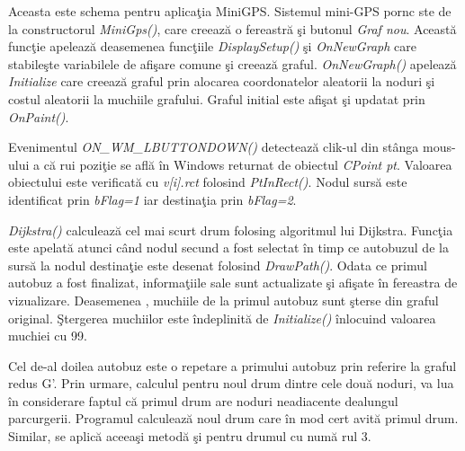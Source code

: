 \documentclass[11pt,a4paper]{report}
\begin{document}
\newline

     Aceasta este schema pentru aplica\c tia MiniGPS. Sistemul mini-GPS pornc ste de la constructorul \textit{MiniGps()}, care creeaz\u a o fereastr\u a \c si butonul \textit{Graf nou}. Aceast\u a func\c tie apeleaz\u a deasemenea func\c tiile \textit{DisplaySetup()} \c si \textit{OnNewGraph} care stabile\c ste variabilele de afi\c sare comune \c si creeaz\u a graful. \textit{OnNewGraph()} apeleaz\u a \textit{Initialize} care creeaz\u a graful prin alocarea coordonatelor aleatorii la noduri \c si costul aleatorii la muchiile grafului. Graful initial este afi\c sat \c si updatat prin \textit{OnPaint()}.
     
     Evenimentul \textit{ON\_WM\_LBUTTONDOWN()} detecteaz\u a clik-ul din st\^ anga mous-ului a c\u a rui pozi\c tie se afl\u a \^ in Windows returnat de obiectul \textit{CPoint pt}. Valoarea obiectului este verificat\u a cu \textit{v[i].rct} folosind \textit{PtInRect()}. Nodul surs\u a este identificat prin \textit{bFlag=1} iar destina\c tia prin \textit{bFlag=2}.
     
     \textit{Dijkstra()} calculeaz\u a cel mai scurt drum folosing algoritmul lui Dijkstra. Func\c tia este apelat\u a atunci c\^ and nodul secund a fost selectat \^ in timp ce autobuzul de la surs\u a la nodul destina\c tie este desenat folosind \textit{DrawPath()}. Odata ce primul autobuz a fost finalizat, informa\c tiile sale sunt actualizate \c si afi\c sate \^ in fereastra de vizualizare. Deasemenea , muchiile de la primul autobuz sunt \c sterse din graful original. \c Stergerea muchiilor este \^ indeplinit\u a de \textit{Initialize()} \^ inlocuind valoarea muchiei cu 99.
     
     Cel de-al doilea autobuz este o repetare a primului autobuz prin referire la graful redus G'. Prin urmare, calculul pentru noul drum dintre cele dou\u a noduri, va lua \^ in considerare faptul c\u a primul drum are noduri neadiacente dealungul parcurgerii. Programul calculeaz\u a noul drum care \^ in mod cert avit\u a primul drum. Similar, se aplic\u a aceea\c si metod\u a \c si pentru drumul cu num\u a rul 3.
\end{document}
